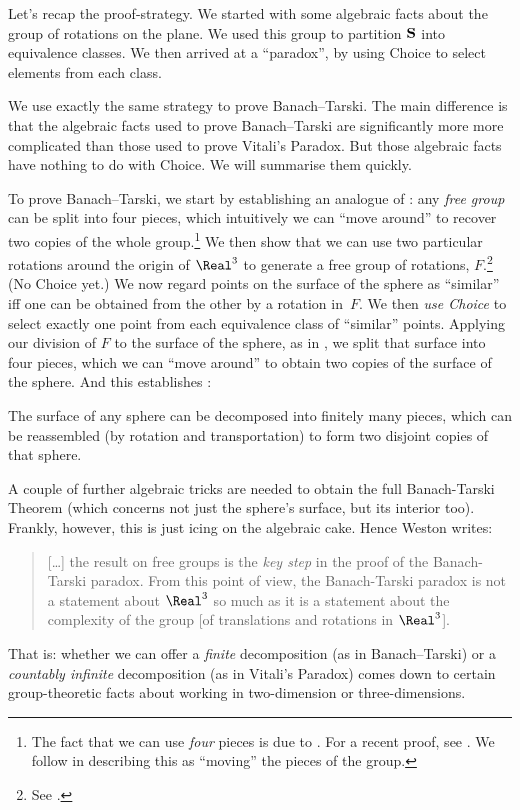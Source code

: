 \documentclass[../../../include/open-logic-section]{subfiles}
\begin{document}
Let's recap the proof-strategy. We started with some algebraic facts
about the group of rotations on the plane. We used this group to
partition $\mathbf{S}$ into equivalence classes. We then arrived at a
``paradox'', by using Choice to select elements from each class.

We use exactly the same strategy to prove Banach--Tarski. The main
difference is that the algebraic facts used to prove Banach--Tarski
are significantly more more complicated than those used to prove
Vitali's Paradox. But those algebraic facts have nothing to do with
Choice. We will summarise them quickly. 

To prove Banach--Tarski, we start by establishing an analogue of
: any \emph{free group} can be split into four
pieces, which intuitively we can ``move around'' to recover two copies
of the whole group.\footnote{The fact that we can use \emph{four}
pieces is due to \cite{Robinson1947}. For a recent proof, see
\citet[Theorem 5.2]{Wagon2016}. We follow \citet[p.~3]{WestonUnpublished}
in describing this as ``moving'' the pieces of the group.} We then
show that we can use two particular rotations around the origin of
$\Real^3$ to generate a free group of rotations, $F$.\footnote{See
\citet[Theorem 2.1]{Wagon2016}.} (No Choice yet.) We now regard points
on the surface of the sphere as ``similar'' iff one can be obtained
from the other by a rotation in~$F$. We then \emph{use Choice} to
select exactly one point from each equivalence class of ``similar''
points. Applying our division of $F$ to the surface of the sphere, as
in , we split that surface into four pieces,
which we can ``move around'' to obtain two copies of the surface of
the sphere. And this establishes \citep{Hausdorff1914}:

\begin{thm} 
The surface of any sphere can be decomposed into finitely many pieces,
which can be reassembled (by rotation and transportation) to form two
disjoint copies of that sphere.
\end{thm}

A couple of further algebraic tricks are needed to obtain the full
Banach-Tarski Theorem (which concerns not just the sphere's surface,
but its interior too). Frankly, however, this is just icing on the
algebraic cake. Hence Weston writes:
\begin{quote}	
  [\ldots] the result on free groups is the \emph{key step} in the
  proof of the Banach-Tarski paradox. From this point of view, the
  Banach-Tarski paradox is not a statement about $\Real^3$ so much as
  it is a statement about the complexity of the group [of translations
  and rotations in $\Real^3$]. \cite[p.~16]{WestonUnpublished}
\end{quote}
That is: whether we can offer a \emph{finite} decomposition (as in
Banach--Tarski) or a \emph{countably infinite} decomposition (as in
Vitali's Paradox) comes down to certain group-theoretic facts about
working in two-dimension or three-dimensions.
\end{document}
